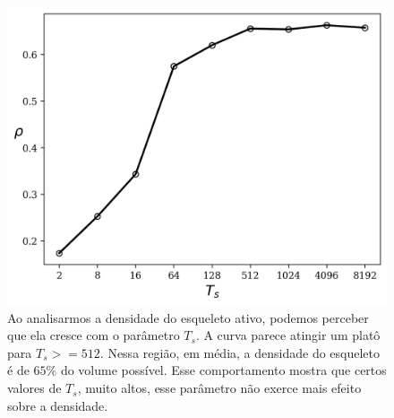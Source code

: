 \documentclass{article}
\begin{document}
\begin{figure}[H]
    \centering
    \includegraphics[width=\textwidth]{figures/dens_ts.png}

    \caption{Ao analisarmos a densidade do esqueleto ativo, podemos perceber que ela cresce com o parâmetro $T_{s}$. A curva parece atingir um platô para $T_{s} >= 512$. Nessa região, em média, a densidade do esqueleto é de $65\%$ do volume possível. Esse comportamento mostra que certos valores de $T_{s}$, muito altos, esse parâmetro não exerce mais efeito sobre a densidade.} 

    \label{}
\end{figure}
\end{document}
